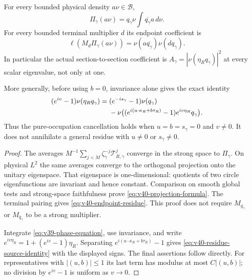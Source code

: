\begin{proposition}
\label{prop:v40-general-residue}
For every bounded physical density $a\nu\in\mathcal B$,
\begin{equation}\label{eq:v40-projection-formula}
 \Pi_\gamma(a\nu)
       =q_\gamma\nu\int\overline{q_\gamma}a\,d\nu.
\end{equation}
For every bounded terminal multiplier $d$ its endpoint coefficient is
\begin{equation}\label{eq:v40-endpoint-residue}
 \ell(M_d\Pi_\gamma(a\nu))
      =\nu(a\overline{q_\gamma})\nu(dq_\gamma).
\end{equation}
In particular the actual section-to-section coefficient is
$A_\gamma=|\nu(\eta_Rq_\gamma)|^2$ at every scalar eigenvalue, not
only at one.

More generally, before using $b=0$, invariance alone gives the exact
identity
\begin{align}\label{eq:v40-residue-source-identity}
 (e^{iv}-1)\nu(\eta_Rq_\gamma)
  ={}&(e^{-is_\gamma}-1)\nu(q_\gamma)\notag\\
     &-\nu\bigl((e^{i(u\cdot\kappa_R+b\tau_R)}-1)
                               e^{iv\eta_R}q_\gamma\bigr).
\end{align}
Thus the pure-occupation cancellation holds when $u=b=s_\gamma=0$
and $v\ne0$. It does not annihilate a general residue with $u\ne0$
or $s_\gamma\ne0$.
\end{proposition}
\begin{proof}
The averages
$M^{-1}\sum_{j<M}\zeta_\gamma^{-j}\mathscr T_{R,\gamma}^j$
converge in the strong space to $\Pi_\gamma$. On physical $L^2$
the same averages converge to the orthogonal projection onto the
unitary eigenspace. That eigenspace is one-dimensional: quotients
of two circle eigenfunctions are invariant and hence constant.
Comparison on smooth global tests and strong-space faithfulness
prove \eqref{eq:v40-projection-formula}. The terminal pairing gives
\eqref{eq:v40-endpoint-residue}. This proof does not require
$M_{q_\gamma}$ or $M_{\overline q_\gamma}$ to be a strong multiplier.

Integrate \eqref{eq:v39-phase-equation}, use invariance, and write
$e^{iv\eta_R}=1+(e^{iv}-1)\eta_R$. Separating
$e^{i(u\cdot\kappa_R+b\tau_R)}-1$ gives
\eqref{eq:v40-residue-source-identity} with the displayed signs.
The final assertions follow directly. For representatives with
$|(u,b)|\le1$ its last term has modulus at most $C|(u,b)|$;
no division by $e^{iv}-1$ is uniform as $v\to0$.
\end{proof}

